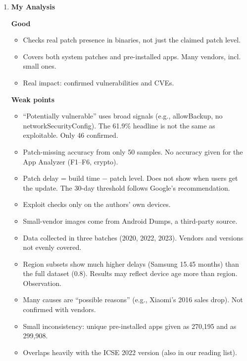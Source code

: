 \documentclass[11pt,a4paper]{article}
\newcommand{\entrypart}[1]{\textbf{\color{accent}#1}\par\vspace{2pt}}
\begin{document}
\begin{enumerate}
    \vspace{4pt}
    \textbf{Limitations (authors)}
    \begin{itemize}
        \item CVE reports have no standard format. Some lack affected versions, so matching can fail.
        \item Packed apps cause false positives and negatives (only 0.21\% packed).
        \item Region information not uniform across vendors. Only large regions compared.
        \item Patch test cases tied to runtime state were dropped, which may cause false positives.
    \end{itemize}

    \item \entrypart{My Analysis}

    \textbf{Good}
    \begin{itemize}
        \item Checks real patch presence in binaries, not just the claimed patch level.
        \item Covers both system patches and pre-installed apps. Many vendors, incl. small ones.
        \item Real impact: confirmed vulnerabilities and CVEs.
    \end{itemize}

    \vspace{4pt}
    \textbf{Weak points}
    \begin{itemize}
        \item ``Potentially vulnerable'' uses broad signals (e.g., allowBackup, no networkSecurityConfig). The 61.9\% headline is not the same as exploitable. Only 46 confirmed.
        \item Patch-missing accuracy from only 50 samples. No accuracy given for the App Analyzer (F1--F6, crypto).
        \item Patch delay = build time $-$ patch level. Does not show when users get the update. The 30-day threshold follows Google's recommendation.
        \item Exploit checks only on the authors' own devices.
        \item Small-vendor images come from Android Dumps, a third-party source.
        \item Data collected in three batches (2020, 2022, 2023). Vendors and versions not evenly covered.
        \item Region subsets show much higher delays (Samsung 15.45 months) than the full dataset (0.8). Results may reflect device age more than region. Observation.
        \item Many causes are ``possible reasons'' (e.g., Xiaomi's 2016 sales drop). Not confirmed with vendors.
        \item Small inconsistency: unique pre-installed apps given as 270,195 and as 299,908.
        \item Overlaps heavily with the ICSE 2022 version (also in our reading list).
    \end{itemize}


\end{enumerate}
\end{document}
